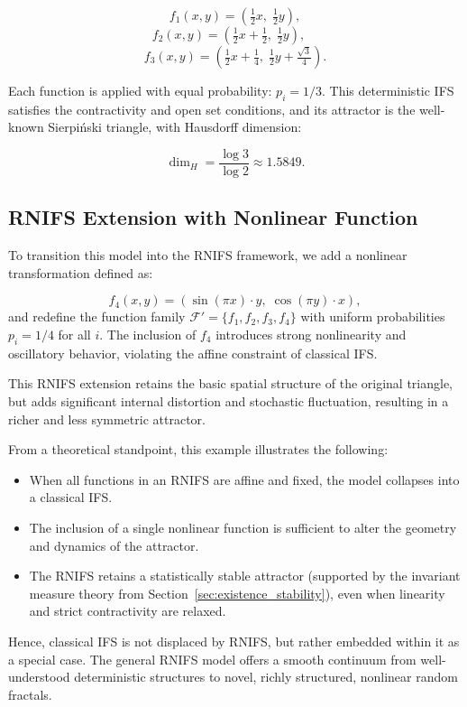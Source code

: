 \documentclass[twocolumn,10pt]{article}
\begin{document}
\[
f_1(x, y) = \left( \tfrac{1}{2}x,\; \tfrac{1}{2}y \right),  \]
\[
f_2(x, y) = \left( \tfrac{1}{2}x + \tfrac{1}{2},\; \tfrac{1}{2}y \right), \quad \]
\[
f_3(x, y) = \left( \tfrac{1}{2}x + \tfrac{1}{4},\; \tfrac{1}{2}y + \tfrac{\sqrt{3}}{4} \right).
\]

Each function is applied with equal probability: $p_i = 1/3$. This deterministic IFS satisfies the contractivity and open set conditions, and its attractor is the well-known Sierpiński triangle, with Hausdorff dimension:

\[
\dim_H = \frac{\log 3}{\log 2} \approx 1.5849.
\]

\subsection{RNIFS Extension with Nonlinear Function}
To transition this model into the RNIFS framework, we add a nonlinear transformation defined as:

\[
f_4(x, y) = \left( \sin(\pi x) \cdot y,\; \cos(\pi y) \cdot x \right),
\] and redefine the function family $\mathcal{F}' = \{ f_1, f_2, f_3, f_4 \}$ with uniform probabilities $p_i = 1/4$ for all $i$. The inclusion of $f_4$ introduces strong nonlinearity and oscillatory behavior, violating the affine constraint of classical IFS.

This RNIFS extension retains the basic spatial structure of the original triangle, but adds significant internal distortion and stochastic fluctuation, resulting in a richer and less symmetric attractor.

From a theoretical standpoint, this example illustrates the following:

\begin{itemize}
    \item When all functions in an RNIFS are affine and fixed, the model collapses into a classical IFS.
    \item The inclusion of a single nonlinear function is sufficient to alter the geometry and dynamics of the attractor.
    \item The RNIFS retains a statistically stable attractor (supported by the invariant measure theory from Section~\ref{sec:existence_stability}), even when linearity and strict contractivity are relaxed.
\end{itemize}

Hence, classical IFS is not displaced by RNIFS, but rather embedded within it as a special case. The general RNIFS model offers a smooth continuum from well-understood deterministic structures to novel, richly structured, nonlinear random fractals.
\end{document}
